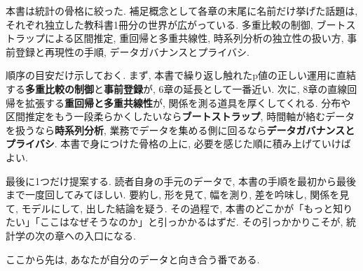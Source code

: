 本書は統計の骨格に絞った. 補足概念として各章の末尾に名前だけ挙げた話題は, それぞれ独立した教科書1冊分の世界が広がっている.
多重比較の制御, ブートストラップによる区間推定, 重回帰と多重共線性, 時系列分析の独立性の扱い方, 事前登録と再現性の手順, データガバナンスとプライバシ.

順序の目安だけ示しておく.
まず, 本書で繰り返し触れたp値の正しい運用に直結する\textbf{多重比較の制御}と\textbf{事前登録}が, 6章の延長として一番近い.
次に, 8章の直線回帰を拡張する\textbf{重回帰と多重共線性}が, 関係を測る道具を厚くしてくれる.
分布や区間推定をもう一段柔らかくしたいなら\textbf{ブートストラップ}, 時間軸が絡むデータを扱うなら\textbf{時系列分析}, 業務でデータを集める側に回るなら\textbf{データガバナンスとプライバシ}.
本書で身につけた骨格の上に, 必要を感じた順に積み上げていけばよい.

最後に1つだけ提案する.
読者自身の手元のデータで, 本書の手順を最初から最後まで一度回してみてほしい.
要約し, 形を見て, 幅を測り, 差を吟味し, 関係を見て, モデルにして, 出した結論を疑う.
その過程で, 本書のどこかが「もっと知りたい」「ここはなぜそうなのか」と引っかかるはずだ.
その引っかかりこそが, 統計学の次の章への入口になる.

ここから先は, あなたが自分のデータと向き合う番である.
